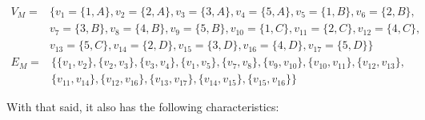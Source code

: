 \documentclass{article}
\begin{document}
    \begin{align*}
        V_{M}=&\{v_{1}=\{1,A\},v_{2}=\{2,A\},v_{3}=\{3,A\},v_{4}=\{5,A\},v_{5}=\{1,B\},v_{6}=\{2,B\},\\
        &v_{7}=\{3,B\},v_{8}=\{4,B\},v_{9}=\{5,B\},v_{10}=\{1,C\},v_{11}=\{2,C\},v_{12}=\{4,C\},\\
        &v_{13}=\{5,C\},v_{14}=\{2,D\},v_{15}=\{3,D\},v_{16}=\{4,D\},v_{17}=\{5,D\}\}
    \end{align*}
    \begin{align*}
        E_{M}=&\{\{v_{1},v_{2}\}, \{v_{2},v_{3}\}, \{v_{3},v_{4}\}, \{v_{1},v_{5}\}, \{v_{7},v_{8}\}, \{v_{9},v_{10}\}, \{v_{10},v_{11}\}, \{v_{12},v_{13}\}, \\ &\{v_{11},v_{14}\}, \{v_{12},v_{16}\}, \{v_{13},v_{17}\}, \{v_{14},v_{15}\}, \{v_{15},v_{16}\}\}
    \end{align*}
    
    \noindent With that said, it also has the following characteristics:
    
\end{document}
